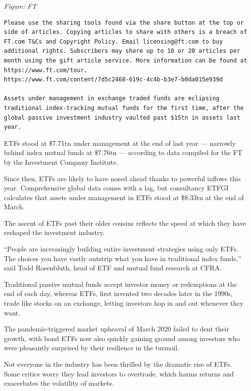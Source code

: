 \documentclass[
]{book}
\begin{document}
\emph{Figure: FT}

\begin{verbatim}
Please use the sharing tools found via the share button at the top or side of articles. Copying articles to share with others is a breach of FT.com T&Cs and Copyright Policy. Email licensing@ft.com to buy additional rights. Subscribers may share up to 10 or 20 articles per month using the gift article service. More information can be found at https://www.ft.com/tour.
https://www.ft.com/content/7d5c2468-619c-4c4b-b3e7-b0da015e939d

Assets under management in exchange traded funds are eclipsing traditional index-tracking mutual funds for the first time, after the global passive investment industry vaulted past $15tn in assets last year.
\end{verbatim}

ETFs stood at \$7.71tn under management at the end of last year --- narrowly behind index mutual funds at \$7.76tn --- according to data compiled for the FT by the Investment Company Institute.

Since then, ETFs are likely to have nosed ahead thanks to powerful inflows this year. Comprehensive global data comes with a lag, but consultancy ETFGI calculates that assets under management in ETFs stood at \$8.33tn at the end of March.

The ascent of ETFs past their older cousins reflects the speed at which they have reshaped the investment industry.

``People are increasingly building entire investment strategies using only ETFs. The choices you have vastly outstrip what you have in traditional index funds,'' said Todd Rosenbluth, head of ETF and mutual fund research at CFRA.

Traditional passive mutual funds accept investor money or redemptions at the end of each day, whereas ETFs, first invented two decades later in the 1990s, trade like stocks on an exchange, letting investors hop in and out whenever they want.

The pandemic-triggered market upheaval of March 2020 failed to dent their growth, with bond ETFs now also quickly gaining ground among investors who were pleasantly surprised by their resilience in the turmoil.

Not everyone in the industry has been thrilled by the dramatic rise of ETFs. Some critics worry they lead investors to overtrade, which harms returns and exacerbates the volatility of markets.
\end{document}
